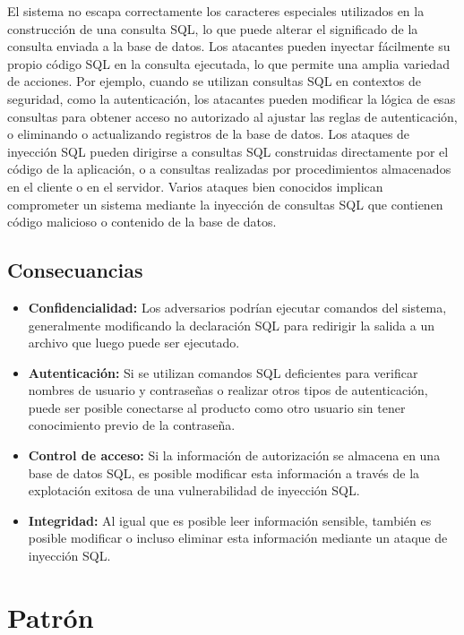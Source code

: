 El sistema no escapa correctamente los caracteres especiales utilizados en la construcción de una consulta SQL, lo que puede alterar el significado de la consulta enviada a la base de datos. Los atacantes pueden inyectar fácilmente su propio código SQL en la consulta ejecutada, lo que permite una amplia variedad de acciones. Por ejemplo, cuando se utilizan consultas SQL en contextos de seguridad, como la autenticación, los atacantes pueden modificar la lógica de esas consultas para obtener acceso no autorizado al ajustar las reglas de autenticación, o eliminando o actualizando registros de la base de datos. 
Los ataques de inyección SQL pueden dirigirse a consultas SQL construidas directamente por el código de la aplicación, o a consultas realizadas por procedimientos almacenados en el cliente o en el servidor. Varios ataques bien conocidos implican comprometer un sistema mediante la inyección de consultas SQL que contienen código malicioso o contenido de la base de datos. 

\subsection{Consecuancias}

\begin{itemize}
    \item \textbf{Confidencialidad:} Los adversarios podrían ejecutar comandos del sistema, generalmente modificando la declaración SQL para redirigir la salida a un archivo que luego puede ser ejecutado.
    \item \textbf{Autenticación:} Si se utilizan comandos SQL deficientes para verificar nombres de usuario y contraseñas o realizar otros tipos de autenticación, puede ser posible conectarse al producto como otro usuario sin tener conocimiento previo de la contraseña.
    \item \textbf{Control de acceso:} Si la información de autorización se almacena en una base de datos SQL, es posible modificar esta información a través de la explotación exitosa de una vulnerabilidad de inyección SQL.
    \item \textbf{Integridad:} Al igual que es posible leer información sensible, también es posible modificar o incluso eliminar esta información mediante un ataque de inyección SQL.
\end{itemize}

\section{\textbf{Patrón}}

